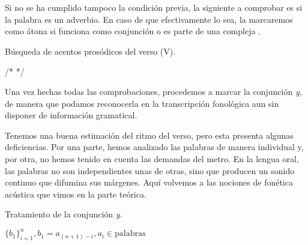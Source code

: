 Si no se ha cumplido tampoco la condición previa, la siguiente a comprobar es si la palabra es un adverbio. En caso de que efectivamente lo sea, la marcaremos como átona si funciona como conjunción o es parte de una compleja \parencite[24]{quilis2013}.

\begin{algorithm}[!ht]
	\caption{Búsqueda de acentos prosódicos del verso (V).}\label{list:findps5}
	\ant \gets {} \;
	/*  */   
\end{algorithm}

Una vez hechas todas las comprobaciones, procedemos a marcar la conjunción \textit{y}, de manera que podamos reconocerla en la transcripción fonológica aun sin disponer de información gramatical.

Tenemos una buena estimación del ritmo del verso, pero esta presenta algunas deficiencias. Por una parte, hemos analizado las palabras de manera individual y, por otra, no hemos tenido en cuenta las demandas del metro. En la lengua oral, las palabras no son independientes unas de otras, sino que producen un sonido continuo que difumina sus márgenes. Aquí volvemos a las nociones de fonética acústica que vimos en la parte teórica.

\begin{algorithm}[!ht]
	\caption{Tratamiento de la conjunción \emph{y}.}\label{list:findps11}
	\words \gets $\{b_1\}^n_{i=1}, b_1=a_{(n+1)-i}, a_i \in \text{palabras} $ \;
\end{algorithm}

